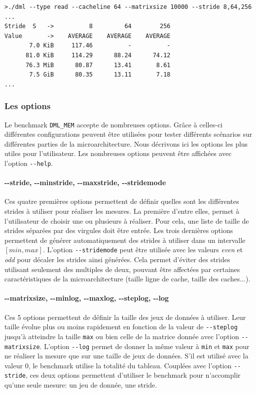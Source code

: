 \begin{verbatim}
>./dml --type read --cacheline 64 --matrixsize 10000 --stride 8,64,256
...
Stride  S   ->          8         64        256
Value       ->    AVERAGE    AVERAGE    AVERAGE
       7.0 KiB     117.46          -          -
      81.0 KiB     114.29      88.24      74.12
      76.3 MiB      80.87      13.41       8.61
       7.5 GiB      80.35      13.11       7.18
...
\end{verbatim}

  

    \subsubsection{Les options}
        Le benchmark \verb=DML_MEM= accepte de nombreuses options. Grâce à celles-ci différentes configurations peuvent être utilisées pour tester différents scénarios sur différentes parties de la microarchitecture. Nous décrivons ici les options les plus utiles pour l'utilisateur. Les nombreuses options peuvent être affichées avec l'option \verb|--help|.
        
        
        \paragraph{-{}-stride, -{}-minstride, -{}-maxstride, -{}-stridemode} Ces quatre premières options permettent de définir quelles sont les différentes strides à utiliser pour réaliser les mesures. La première d'entre elles, permet à l'utilisateur de choisir une ou plusieurs à réaliser. Pour cela, une liste de taille de strides séparées par des virgules doit être entrée. Les trois dernières options permettent de générer automatiquement des strides à utiliser dans un intervalle $[min, max]$. L'option \verb|--stridemode| peut être utilisée avec les valeurs \textit{even} et \textit{odd} pour décaler les strides ainsi générées. Cela permet d'éviter des strides utilisant seulement des multiples de deux, pouvant être affectées par certaines caractéristiques de la microarchitecture (taille ligne de cache, taille des caches...). 
        
        \paragraph{-{}-matrixsize, -{}-minlog, -{}-maxlog, -{}-steplog, -{}-log} Ces 5 options permettent de définir la taille des jeux de données à utiliser. Leur taille évolue plus ou moins rapidement en fonction de la valeur de \verb|--steplog| jusqu'à atteindre la taille \verb|max| ou bien celle de la matrice donnée avec l'option \verb|--matrixsize|. L'option \verb|--log| permet de donner la même valeur à \verb|min| et \verb|max| pour ne réaliser la mesure que sur une taille de jeux de données. S'il est utilisé avec la valeur $0$, le benchmark utilise la totalité du tableau. Couplées avec l'option \verb|--stride|, ces deux options permettent d'utiliser le benchmark pour n'accomplir qu'une seule mesure: un jeu de donnée, une stride.
        
